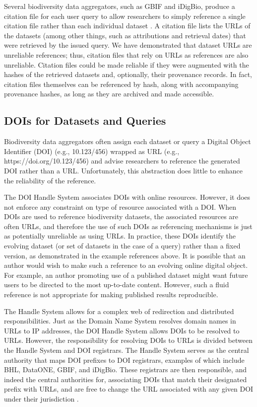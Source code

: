 Several biodiversity data aggregators, such as GBIF and iDigBio, produce a citation file for each user query to allow researchers to simply reference a single citation file rather than each individual dataset . A citation file lists the URLs of the datasets (among other things, such as attributions and retrieval dates) that were retrieved by the issued query. We have demonstrated that dataset URLs are unreliable references; thus, citation files that rely on URLs as references are also unreliable. Citation files could be made reliable if they were augmented with the hashes of the retrieved datasets and, optionally, their provenance records. In fact, citation files themselves can be referenced by hash, along with accompanying provenance hashes, as long as they are archived and made accessible.

\subsection*{DOIs for Datasets and Queries}
Biodiversity data aggregators often assign each dataset or query a Digital Object Identifier (DOI) \citep{Paskin_2009} (e.g., 10.123/456) wrapped as URL (e.g., https://doi.org/10.123/456) and advise researchers to reference the generated DOI rather than a URL. Unfortunately, this abstraction does little to enhance the reliability of the reference.

The DOI Handle System \citep{Paskin_2009} associates DOIs with online resources. However, it does not enforce any constraint on type of resource associated with a DOI. When DOIs are used to reference biodiversity datasets, the associated resources are often URLs, and therefore the use of such DOIs as referencing mechanisms is just as potentially unreliable as using URLs. In practice, these DOIs identify the evolving dataset (or set of datasets in the case of a query) rather than a fixed version, as demonstrated in the example references above. It is possible that an author would wish to make such a reference to an evolving online digital object. For example, an author promoting use of a published dataset might want future users to be directed to the most up-to-date content. However, such a fluid reference is not appropriate for making published results reproducible.

The Handle System allows for a complex web of redirection and distributed responsibilities. Just as the Domain Name System resolves domain names in URLs to IP addresses, the DOI Handle System allows DOIs to be resolved to URLs. However, the responsibility for resolving DOIs to URLs is divided between the Handle System and DOI registrars. The Handle System serves as the central authority that maps DOI prefixes to DOI registrars, examples of which include BHL, DataONE, GBIF, and iDigBio. These registrars are then responsible, and indeed the central authorities for, associating DOIs that match their designated prefix with URLs, and are free to change the URL associated with any given DOI under their jurisdiction \citep{Paskin_2009,DOI_2018}.

